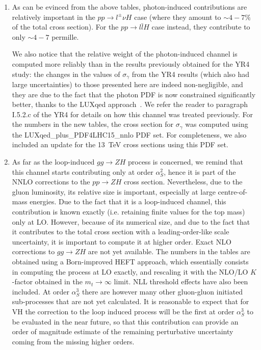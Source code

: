 \begin{enumerate}
\item As can be evinced from the above tables, photon-induced
  contributions are relatively important in the $p p \to l^\pm \nu H$
  case (where they amount to $\sim 4-7 \%$ of the total cross
  section). For the $pp\to l\bar l H$ case instead, they contribute to
  only $\sim 4-7$ permille.

  We also notice that the relative weight of the photon-induced
  channel is computed more reliably than in the results previously obtained
  for the YR4 study: the changes in the values of $\sigma_\gamma$ from
  the YR4 results (which also had large uncertainties) to those
  presented here are indeed non-negligible, and they are due to the
  fact that the photon PDF is now constrained significantly better, thanks to
  the LUXqed approach~\cite{Manohar:2016nzj,Manohar:2017eqh}. We refer
  the reader to paragraph I.5.2.c of the YR4 for details on how this
  channel was treated previously. For the numbers in the new tables,
  the cross section for $\sigma_\gamma$ was computed using the
  LUXqed\_plus\_PDF4LHC15\_nnlo PDF set. For completeness, we also
  included an update for the 13~TeV cross sections using this PDF set.
  
\item As far as the loop-induced $gg\rightarrow ZH$ process is
  concerned, we remind that this channel starts contributing only at
  order $\alpha_S^2$, hence it is part of the NNLO corrections to the
  $pp \rightarrow ZH$ cross section. Nevertheless, due to the gluon
  luminosity, its relative size is important, especially at large
  centre-of-mass energies.
Due to the fact that it is a loop-induced channel, this contribution
is known exactly (i.e. retaining finite values for the top mass) only at
LO.  However, because of its numerical size, and due to the fact that
it contributes to the total cross section with a leading-order-like
scale uncertainty, it is important to compute it at higher order.
Exact NLO corrections to $gg \rightarrow ZH$ are not yet available. The numbers in
the tables are obtained using a Born-improved HEFT approach, which
essentially consists in computing the process at LO exactly, and
rescaling it with the NLO/LO $K$-factor obtained in the
$m_t\to\infty$ limit. NLL threshold effects have also been
included. At order $\alpha_S^3$ there are however many other gluon-gluon initiated sub-processes
that are not yet calculated. It is reasonable
to expect that for VH the correction to the loop induced process will be the
first at order $\alpha_S^3$ to be evaluated in the near future, so that this contribution can provide an order of magnitude estimate of the remaining
perturbative uncertainty
coming from the missing higher orders.
\end{enumerate}

